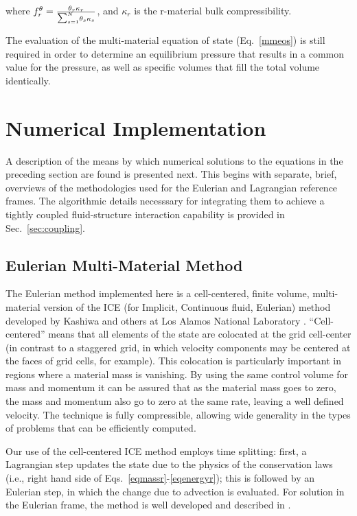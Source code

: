 where 
$f_r^{\theta} = {{\theta_r \kappa_r} \over 
   {\raise1pt\hbox{${\scriptstyle\sum_{s =1}^N}$}}\theta_s\kappa_s}$, 
and $\kappa_r$ is the r-material bulk compressibility.

The evaluation of the multi-material equation of state (Eq.~\ref{mmeos}) is 
still required in order to determine an equilibrium pressure that results in a 
common value for the  pressure, as well as specific volumes that fill the 
total volume identically.

\section{Numerical Implementation}\label{sec:numerical_algorithm}

A description of the means by which numerical solutions to the equations in 
the preceding section are found is presented next.  This begins with 
separate, brief, overviews of the methodologies used for the Eulerian and 
Lagrangian reference frames.  The algorithmic details necesssary for
integrating them to achieve a tightly coupled fluid-structure interaction 
capability is provided in Sec.~\ref{sec:coupling}.

\subsection{Eulerian Multi-Material Method}\label{sec:EulerianMFM}

The Eulerian method implemented here is a
cell-centered, finite volume, multi-material version of the ICE
(for Implicit, Continuous fluid, Eulerian) method \cite{Harlow1968}
developed by Kashiwa and others at Los Alamos National
Laboratory \cite{Kashiwa1994a}.  ``Cell-centered'' means that all elements
of the state are colocated at the grid cell-center (in contrast to a 
staggered grid,
in which velocity components may be centered at the faces of grid cells, for
example).  This colocation is particularly important in regions where a
material mass is vanishing.  By using the same control volume for mass and
momentum it can be assured that as the material mass goes to zero, the mass
and momentum also go to zero at the same rate, leaving a well defined
velocity.  The technique is fully compressible, allowing wide generality in
the types of problems that can be efficiently computed. 
 
Our use of the cell-centered ICE method employs time splitting: first, a
Lagrangian step updates the state due to the physics of the conservation laws
(i.e., right hand side of Eqs.~{\ref{eqmassr}-\ref{eqenergyr}}); this is
followed by an Eulerian step, in which the change due to advection is
evaluated.  For solution in the Eulerian frame, the method is well developed
and described in \cite{Kashiwa1994a}.  

